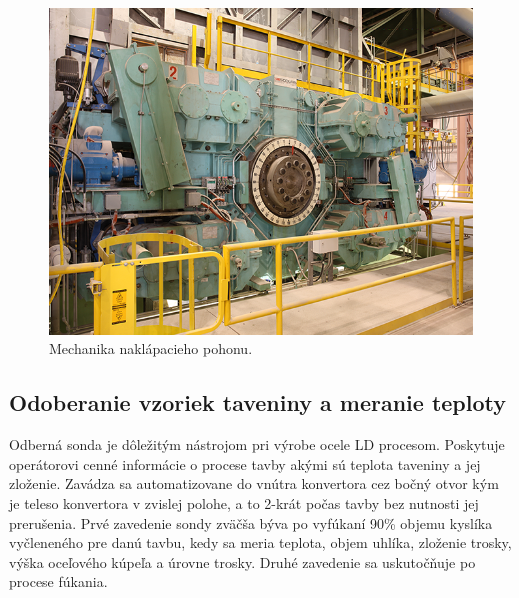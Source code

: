 \documentclass[]{tukediphc}
\begin{document}
\begin{figure}[h!]
	\centering
	\includegraphics[width=.7\textwidth,angle=0]{figures/convertor-tilting-drive.png}
	\caption{Mechanika naklápacieho pohonu.}
\end{figure}

\subsection{Odoberanie vzoriek taveniny a meranie teploty}

Odberná sonda je dôležitým nástrojom pri výrobe ocele LD procesom. Poskytuje operátorovi cenné informácie o procese tavby akými sú teplota taveniny a jej zloženie. Zavádza sa automatizovane do vnútra konvertora cez bočný otvor kým je teleso konvertora v zvislej polohe, a to 2-krát počas tavby bez nutnosti jej prerušenia. Prvé zavedenie sondy zväčša býva po vyfúkaní 90\% objemu kyslíka vyčleneného pre danú tavbu, kedy sa meria teplota, objem uhlíka, zloženie trosky, výška oceľového kúpeľa a úrovne trosky. Druhé zavedenie sa uskutočňuje po procese fúkania.
\end{document}
